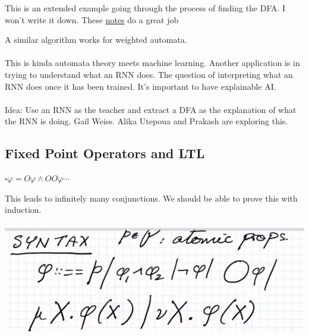 \documentclass[../598comp.tex]{subfiles}
\begin{document}
\begin{example}
  This is an extended example going through the process of finding the DFA. I
  won't write it down. These
  \href{https://cs.mcgill.ca/~prakash/Courses/598/Notes/ariella_notes_learning_automata.pdf}{notes}
  do a great job 
\end{example}
A similar algorithm works for weighted automata.
\\\\
This is kinda automata theory meets machine learning. Another application is in
trying to understand what an RNN does. The question of interpreting what an RNN
does once it has been trained. It's important to have explainable AI.
\\\\
Idea: Use an RNN as the teacher and extract a DFA as the explanation of what the
RNN is doing. Gail Weiss. Alika Utepoua and Prakash are exploring this.

\subsection{Fixed Point Operators and LTL}

$\square \varphi = O \varphi \wedge OO \varphi \cdots$

This leads to infinitely many conjunctions. We should be able to prove this with
induction.
\\\\
\includegraphics[width=\textwidth]{syntax_fixed.png}
\end{document}
